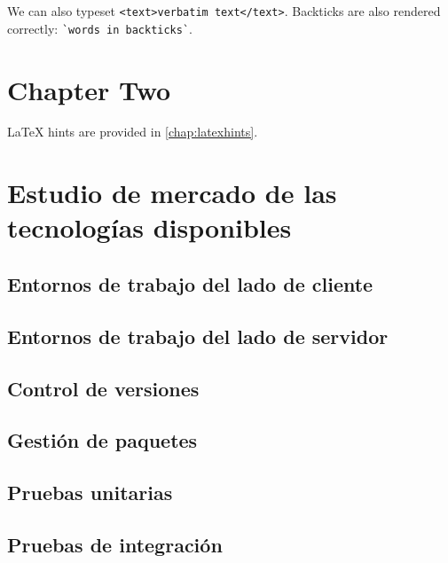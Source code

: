 \documentclass[
  a4paper,  %
  twoside,  %
  bibliography=totoc,
  headsepline,
  cleardoublepage=empty,
  parskip=half,
  draft=false
]{scrbook}
\begin{document}
We can also typeset \verb|<text>verbatim text</text>|.
Backticks are also rendered correctly: \verb|`words in backticks`|.

\chapter{Chapter Two}
\label{chap:k2}

LaTeX hints are provided in \cref{chap:latexhints}.

\chapter{Estudio de mercado de las tecnologías disponibles}
\label{chap:techMarketResearch}

\section{Entornos de trabajo del lado de cliente}



\section{Entornos de trabajo del lado de servidor}



\section{Control de versiones}



\section{Gestión de paquetes}



\section{Pruebas unitarias}
\label{section:unit-testing}



\section{Pruebas de integración}
\label{section:integration-testing}
\end{document}

